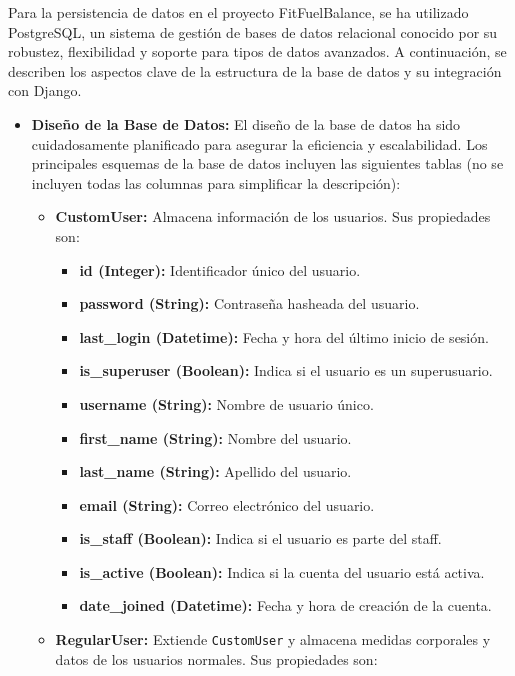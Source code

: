 Para la persistencia de datos en el proyecto FitFuelBalance, se ha utilizado PostgreSQL, un sistema de gestión de bases de datos relacional conocido por su robustez, flexibilidad y soporte para tipos de datos avanzados. A continuación, se describen los aspectos clave de la estructura de la base de datos y su integración con Django.

\begin{itemize}
    \item \textbf{Diseño de la Base de Datos:} El diseño de la base de datos ha sido cuidadosamente planificado para asegurar la eficiencia y escalabilidad. Los principales esquemas de la base de datos incluyen las siguientes tablas (no se incluyen todas las columnas para simplificar la descripción):
    \begin{itemize}
        \item \textbf{CustomUser:} Almacena información de los usuarios. Sus propiedades son:
        \begin{itemize}
            \item \textbf{id (Integer):} Identificador único del usuario.
            \item \textbf{password (String):} Contraseña hasheada del usuario.
            \item \textbf{last\_login (Datetime):} Fecha y hora del último inicio de sesión.
            \item \textbf{is\_superuser (Boolean):} Indica si el usuario es un superusuario.
            \item \textbf{username (String):} Nombre de usuario único.
            \item \textbf{first\_name (String):} Nombre del usuario.
            \item \textbf{last\_name (String):} Apellido del usuario.
            \item \textbf{email (String):} Correo electrónico del usuario.
            \item \textbf{is\_staff (Boolean):} Indica si el usuario es parte del staff.
            \item \textbf{is\_active (Boolean):} Indica si la cuenta del usuario está activa.
            \item \textbf{date\_joined (Datetime):} Fecha y hora de creación de la cuenta.
        \end{itemize}
        \item \textbf{RegularUser:} Extiende \texttt{CustomUser} y almacena medidas corporales y datos de los usuarios normales. Sus propiedades son:

\end{itemize}
\end{itemize}

